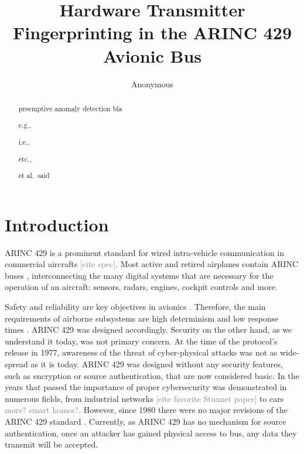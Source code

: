 \documentclass[conference]{IEEEtran}
\title{Hardware Transmitter Fingerprinting in the ARINC 429 Avionic Bus}
\author{Anonymous}
\begin{document}
\maketitle

\begin{abstract}
  preemptive anomaly detection
    bla
    
    e.g., 
    
    i.e.,
    
    etc.,
    
    et al.\ said
    
\end{abstract}


\section{Introduction}
  
  ARINC 429 is a prominent standard for wired intra-vehicle communication in commercial aircrafts \textcolor{gray}{[cite spec]}. Most active and retired airplanes contain ARINC buses \cite{fuchs2012evolution}, interconnecting the many digital systems that are necessary for the operation of an aircraft: sensors, radars, engines, cockpit controls and more.
  
  Safety and reliability are key objectives in avionics \cite{fuchs2012evolution}. Therefore, the main requirements of airborne subsystems are high determinism and low response times \cite{thanthry2005aviation}. ARINC 429 was designed accordingly. Security on the other hand, as we understand it today, was not primary concern. At the time of the protocol's release in 1977, awareness of the threat of cyber-physical attacks was not as wide-spread as it is today. ARINC 429 was designed without any security features, such as encryption or source authentication, that are now considered basic. In the years that passed the importance of proper cybersecurity was demonstrated in numerous fields, from industrial networks \textcolor{gray}{[cite favorite Stuxnet paper]} to cars \cite{miller2015remote} \textcolor{gray}{more? smart homes?}. However, since 1980 there were no major revisions of the ARINC 429 standard \cite{18937420070101}. Currently, as ARINC 429 has no mechanism for source authentication, once an attacker has gained physical access to bus, any data they transmit will be accepted.
  
\end{document}

